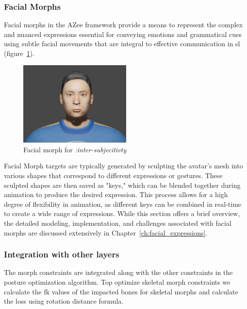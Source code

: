 \documentclass[../../main.tex]{subfiles}
\begin{document}
\subsubsection{Facial Morphs}
\label{ch:avatar_creation_pose_synthesis:proc_rig_signing_avatars:morph_constraints:facial_morphs}

Facial morphs in the AZee framework provide a means to represent the complex and nuanced expressions essential for conveying emotions and grammatical cues using subtle facial movements that are integral to effective communication in \gls{sl} (figure~\ref{fig:facial_example}).

\begin{figure}
    \centering
    \includegraphics[width=0.5\textwidth]{chapters/avatar_creation_pose_synthesis/images/facial_example.png}
    \caption{Facial morph for \emph{:inter-subjecitivty}}
    \label{fig:facial_example}
\end{figure}

Facial Morph targets are typically generated by sculpting the avatar's mesh into various shapes that correspond to different expressions or gestures. These sculpted shapes are then saved as "keys," which can be blended together during animation to produce the desired expression. This process allows for a high degree of flexibility in animation, as different keys can be combined in real-time to create a wide range of expressions. While this section offers a brief overview, the detailed modeling, implementation, and challenges associated with facial morphs are discussed extensively in Chapter~\ref{ch:facial_expressions}.

\subsubsection{Integration with other layers}
\label{ch:avatar_creation_pose_synthesis:proc_rig_signing_avatars:morph_constraints:intergation}

The morph constraints are integrated along with the other constraints in the posture optimization algorithm. Top optimize skeletal morph constraints we calculate the \gls{fk} values of the impacted bones for skeletal morphs and calculate the loss using rotation distance formula.
\end{document}
